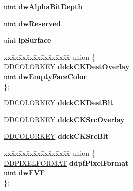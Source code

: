 \begin{DoxyCompactItemize}
\begin{tabbing}
\end{tabbing}\item 
\mbox{\label{struct_d_d_s_u_r_f_a_c_e_d_e_s_c2_ad6a8c0b0ea9f7756797a75142c96cd42}} 
uint {\bfseries dw\+Alpha\+Bit\+Depth}
\item 
\mbox{\label{struct_d_d_s_u_r_f_a_c_e_d_e_s_c2_a980b41e3171b7623cbfffe6dfddc5906}} 
uint {\bfseries dw\+Reserved}
\item 
\mbox{\label{struct_d_d_s_u_r_f_a_c_e_d_e_s_c2_a283d284a2ad3f6e7eb9ca0d4cef4c690}} 
uint {\bfseries lp\+Surface}
\item 
\mbox{\label{struct_d_d_s_u_r_f_a_c_e_d_e_s_c2_ac7b28d880e45e9c7a077494f8c995d5f}} 
\begin{tabbing}
xx\=xx\=xx\=xx\=xx\=xx\=xx\=xx\=xx\=\kill
union \{\\
\>\hyperlink{struct_d_d_c_o_l_o_r_k_e_y}{DDCOLORKEY} {\bfseries ddckCKDestOverlay}\\
\>uint {\bfseries dwEmptyFaceColor}\\
\}; \\

\end{tabbing}\item 
\mbox{\label{struct_d_d_s_u_r_f_a_c_e_d_e_s_c2_aa5c27e8a198a03a72a543263a034ac11}} 
\hyperlink{struct_d_d_c_o_l_o_r_k_e_y}{D\+D\+C\+O\+L\+O\+R\+K\+EY} {\bfseries ddck\+C\+K\+Dest\+Blt}
\item 
\mbox{\label{struct_d_d_s_u_r_f_a_c_e_d_e_s_c2_af22c85d5804581fca26e00c402145ac6}} 
\hyperlink{struct_d_d_c_o_l_o_r_k_e_y}{D\+D\+C\+O\+L\+O\+R\+K\+EY} {\bfseries ddck\+C\+K\+Src\+Overlay}
\item 
\mbox{\label{struct_d_d_s_u_r_f_a_c_e_d_e_s_c2_ab867f780f3b125326eb4a38522d10e58}} 
\hyperlink{struct_d_d_c_o_l_o_r_k_e_y}{D\+D\+C\+O\+L\+O\+R\+K\+EY} {\bfseries ddck\+C\+K\+Src\+Blt}
\item 
\mbox{\label{struct_d_d_s_u_r_f_a_c_e_d_e_s_c2_a138709477e2c5f9a3cd101dd8d208ca8}} 
\begin{tabbing}
xx\=xx\=xx\=xx\=xx\=xx\=xx\=xx\=xx\=\kill
union \{\\
\>\hyperlink{struct_d_d_p_i_x_e_l_f_o_r_m_a_t}{DDPIXELFORMAT} {\bfseries ddpfPixelFormat}\\
\>uint {\bfseries dwFVF}\\
\}; \\


\end{tabbing}
\end{DoxyCompactItemize}
